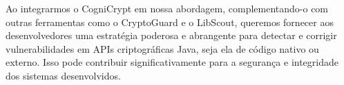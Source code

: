 
Ao integrarmos o CogniCrypt em nossa abordagem, complementando-o com outras ferramentas como o CryptoGuard e o LibScout, queremos fornecer aos desenvolvedores uma estratégia poderosa e abrangente para detectar e corrigir vulnerabilidades em APIs criptográficas Java, seja ela de código nativo ou externo. Isso pode contribuir significativamente para a segurança e integridade dos sistemas desenvolvidos.


